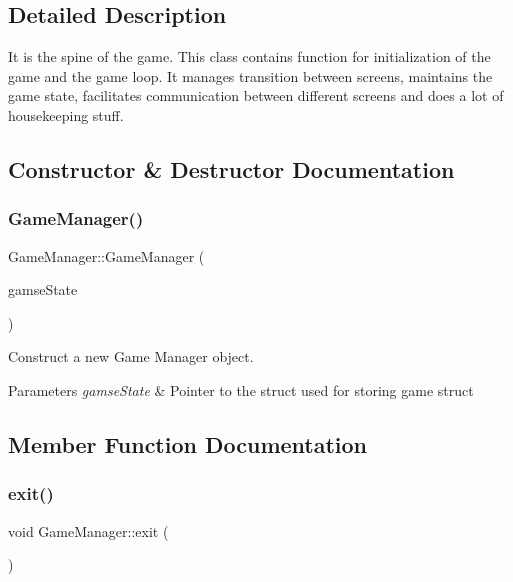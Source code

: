 \subsection{Detailed Description}
It is the spine of the game. This class contains function for initialization of the game and the game loop. It manages transition between screens, maintains the game state, facilitates communication between different screens and does a lot of housekeeping stuff. 



\subsection{Constructor \& Destructor Documentation}
\mbox{\label{class_game_manager_aa9d8973a248b62eb1ad5e88ca0ad04ee}} 
\subsubsection{\texorpdfstring{GameManager()}{GameManager()}}
{\footnotesize\ttfamily Game\+Manager\+::\+Game\+Manager (\begin{DoxyParamCaption}\item[{\mbox{\hyperlink{struct_game_state}{Game\+State}} $\ast$}]{gamse\+State }\end{DoxyParamCaption})}



Construct a new Game Manager object. 


\begin{DoxyParams}{Parameters}
{\em gamse\+State} & Pointer to the struct used for storing game struct \\
\hline
\end{DoxyParams}


\subsection{Member Function Documentation}
\mbox{\label{class_game_manager_a9642ca91519c300ba48cc1960d3aaf46}} 
\subsubsection{\texorpdfstring{exit()}{exit()}}
{\footnotesize\ttfamily void Game\+Manager\+::exit (\begin{DoxyParamCaption}\item[{void}]{ }\end{DoxyParamCaption})}



